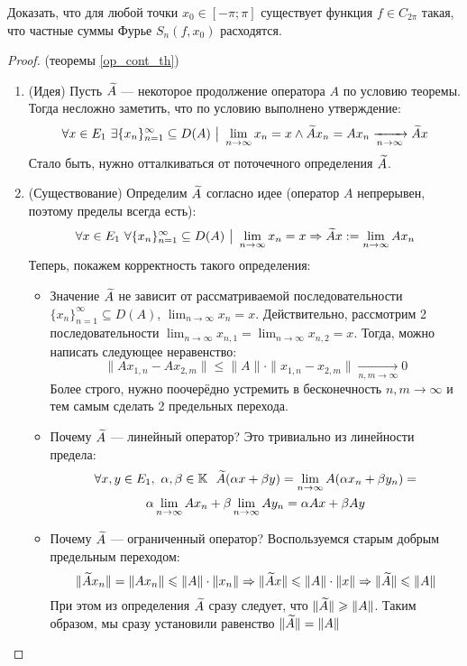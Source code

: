 \begin{exercise}
	Доказать, что для любой точки $x_0 \in [-\pi; \pi]$ существует функция $f \in C_{2\pi}$ такая, что частные суммы Фурье $S_n(f, x_0)$ расходятся.
\end{exercise}

\begin{proof} (теоремы \ref{op_cont_th})
	\begin{enumerate}
		\item (Идея) Пусть $\widetilde{A}$ --- некоторое продолжение оператора $A$ по условию теоремы. Тогда несложно заметить, что по условию выполнено утверждение:
		\[
			\forall x \in E_1\ \exists \{x_n\}_{n = 1}^\infty \subseteq D(A) \ \big|\  \lim_{n \to \infty} x_n = x \wedge \widetilde{A}x_n = Ax_n \xrightarrow[n \to \infty]{} \widetilde{A}x
		\]
		Стало быть, нужно отталкиваться от поточечного определения $\widetilde{A}$.
		
		\item (Существование) Определим $\widetilde{A}$ согласно идее (оператор $A$ непрерывен, поэтому пределы всегда есть):
		\[
			\forall x \in E_1\ \forall \{x_n\}_{n = 1}^\infty \subseteq D(A) \ \big|\  \lim_{n \to \infty} x_n = x \Rightarrow \widetilde{A}x := \lim_{n \to \infty} Ax_n
		\]
		Теперь, покажем корректность такого определения:
		\begin{itemize}
			\item Значение $\widetilde{A}$ не зависит от рассматриваемой последовательности $\{x_n\}_{n = 1}^\infty \subseteq D(A)$, $\lim_{n \to \infty} x_n = x$. Действительно, рассмотрим 2 последовательности $\lim_{n \to \infty} x_{n, 1} = \lim_{n \to \infty} x_{n, 2} = x$. Тогда, можно написать следующее неравенство:
			\[
				\|Ax_{1, n} - Ax_{2, m}\| \le \|A\| \cdot \|x_{1, n} - x_{2, m}\| \xrightarrow[n, m \to \infty]{} 0
			\]
			Более строго, нужно поочерёдно устремить в бесконечность $n, m \to \infty$ и тем самым сделать 2 предельных перехода.
			
			\item Почему $\widetilde{A}$ --- линейный оператор? Это тривиально из линейности предела:
			\begin{multline*}
				\forall x, y \in E_1,\ \alpha, \beta \in \K\ \ \wdt{A}(\alpha x + \beta y) = \lim_{n \to \infty} A(\alpha x_n + \beta y_n) =
				\\
				\alpha \lim_{n \to \infty} Ax_n + \beta \lim_{n \to \infty} Ay_n = \alpha Ax + \beta Ay
			\end{multline*}
			
			\item Почему $\widetilde{A}$ --- ограниченный оператор? Воспользуемся старым добрым предельным переходом:
			\[
				\|\widetilde{A}x_n\| = \|Ax_n\| \leqslant \|A\| \cdot \|x_n\| \Rightarrow \|\widetilde{A}x\| \leqslant \|A\| \cdot \|x\| \Rightarrow \|\widetilde{A}\| \leqslant \|A\|
			\]
			При этом из определения $\widetilde{A}$ сразу следует, что $\|\widetilde{A}\| \geqslant \|A\|$. Таким образом, мы сразу установили равенство $\|\widetilde{A}\| = \|A\|$
		\end{itemize}
	

\end{enumerate}
\end{proof}
